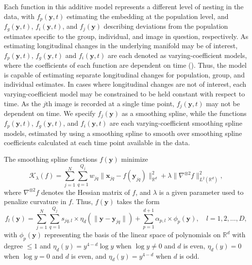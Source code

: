 \documentclass[11pt,reqno]{article}
\theoremstyle{definition}
\begin{document}
Each function in this additive model represents a different level of nesting in the data, with $f_p(\mathbf{y}, t)$ estimating the embedding at the population level, and $f_g(\mathbf{y}, t)$, $f_i(\mathbf{y}, t)$, and $f_{j}(\mathbf{y})$ describing deviations from the population estimates specific to the group, individual, and image in question, respectively. As estimating longitudinal changes in the underlying manifold may be of interest, $f_p(\mathbf{y}, t)$, $f_g(\mathbf{y}, t)$ and $f_i(\mathbf{y}, t)$ are each denoted as varying-coefficient models, where the coefficients of each function are dependent on time (\cite{hastieVaryingCoefficientModels1993}). Thus, the model is capable of estimating separate longitudinal changes for population, group, and individual estimates. In cases where longitudinal changes are not of interest, each varying-coefficient model may be constrained to be held constant with respect to time. As the $j$th image is recorded at a single time point, $f_{j}(\mathbf{y}, t)$ may not be dependent on time. We specify $f_{j}(\mathbf{y})$ as a smoothing spline, while the functions $f_p(\mathbf{y}, t)$, $f_g(\mathbf{y}, t)$, and $f_i(\mathbf{y}, t)$ are each varying-coefficient smoothing spline models, estimated by using a smoothing spline to smooth over smoothing spline coefficients calculated at each time point available in the data. 

The smoothing spline functions $f(\mathbf{y})$ minimize 
\[%
  \mathcal{K}_{\lambda}(f) = \sum_{j=1}^{N}\sum_{q=1}^{Q_j}w_{jq}\|\mathbf{x}_{jq} - f(\mathbf{y}_{jq})\|^2_{\mathbb{R}^{d}} + \lambda\|\nabla^{\otimes 2}f\|^2_{L^2(\mathbb{R}^{d})}
,\]%
where $\nabla^{\otimes 2}f$ denotes the Hessian matrix of $f$, and $\lambda$ is a given parameter used to penalize curvature in $f$. Thus, $f(\mathbf{y})$ takes the form
\begin{equation}
  f_l(\mathbf{y}) = \sum_{j=1}^{N}\sum_{q=1}^{Q_j}s_{jq, l} \times \eta_{d}\left(\|\mathbf{y} - \mathbf{y}_{jq}\|\right) + \sum_{p = 1}^{d + 1}\alpha_{p, l} \times \phi_{p}(\mathbf{y}), \quad l = 1, 2, \dots, D, \label{eq:3}
\end{equation}
with $\phi_p(\mathbf{y})$ representing the basis of the linear space of polynomials on $\mathbb{R}^{d}$ with degree $\leq 1$ and $\eta_{d}(y) = y^{4-d}\log y$ when $\log y \neq 0$ and $d$ is even, $\eta_{d}(y) = 0$ when $\log y = 0$ and $d$ is even, and $\eta_{d}(y) = y^{4-d}$ when $d$ is odd. 
\end{document}
